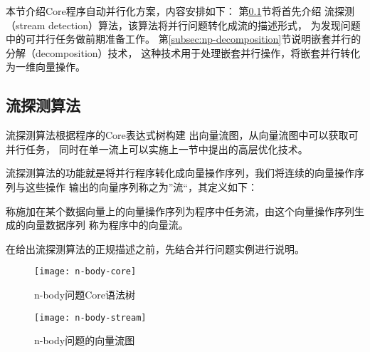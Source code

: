 本节介绍Core程序自动并行化方案，内容安排如下：
第\ref{subsec:stream-detection}节将首先介绍
流探测（stream detection）算法，该算法将并行问题转化成流的描述形式，
为发现问题中的可并行任务做前期准备工作。
第\ref{subsec:np-decomposition}节说明嵌套并行的分解（decomposition）技术，
这种技术用于处理嵌套并行操作，将嵌套并行转化为一维向量操作。

\subsection{流探测算法}\label{subsec:stream-detection}
流探测算法根据程序的Core表达式树构建
出向量流图，从向量流图中可以获取可并行任务，
同时在单一流上可以实施上一节中提出的高层优化技术。

流探测算法的功能就是将并行程序转化成向量操作序列，我们将连续的向量操作序列与这些操作
输出的向量序列称之为”流“，其定义如下：
\begin{definition}
  称施加在某个数据向量上的向量操作序列为程序中任务流，由这个向量操作序列生成的向量数据序列
  称为程序中的向量流。
\end{definition}

在给出流探测算法的正规描述之前，先结合并行问题实例进行说明。
\begin{quotation}
\end{quotation}
\begin{figure}
  \centering
  \texttt{[image: n-body-core]}
  \caption{n-body问题Core语法树}
  \label{fig:n-body-core}
\end{figure}
\begin{figure}
  \centering
  \texttt{[image: n-body-stream]}
  \caption{n-body问题的向量流图}
  \label{fig:n-body-stream}
\end{figure}

